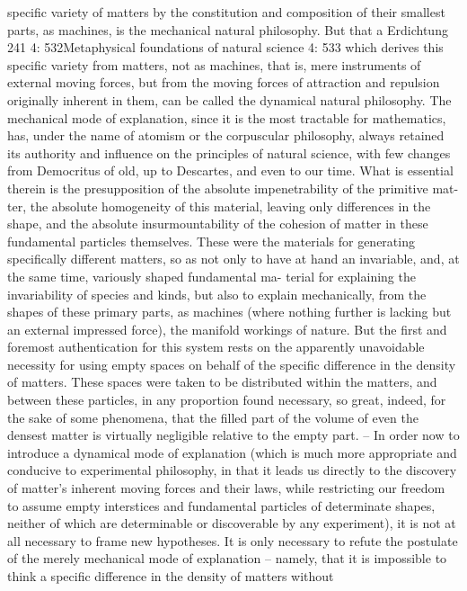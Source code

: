 speciﬁc variety of matters by the constitution and composition of their
smallest parts, as machines, is the mechanical natural philosophy. But that
a
Erdichtung
241
4: 532Metaphysical foundations of natural science
4: 533
which derives this speciﬁc variety from matters, not as machines, that is,
mere instruments of external moving forces, but from the moving forces
of attraction and repulsion originally inherent in them, can be called the
dynamical natural philosophy. The mechanical mode of explanation, since
it is the most tractable for mathematics, has, under the name of atomism
or the corpuscular philosophy, always retained its authority and inﬂuence
on the principles of natural science, with few changes from Democritus
of old, up to Descartes, and even to our time. What is essential therein
is the presupposition of the absolute impenetrability of the primitive mat-
ter, the absolute homogeneity of this material, leaving only differences in
the shape, and the absolute insurmountability of the cohesion of matter
in these fundamental particles themselves. These were the materials for
generating speciﬁcally different matters, so as not only to have at hand
an invariable, and, at the same time, variously shaped fundamental ma-
terial for explaining the invariability of species and kinds, but also to
explain mechanically, from the shapes of these primary parts, as machines
(where nothing further is lacking but an external impressed force), the
manifold workings of nature. But the ﬁrst and foremost authentication
for this system rests on the apparently unavoidable necessity for using
empty spaces on behalf of the speciﬁc difference in the density of matters. These
spaces were taken to be distributed within the matters, and between
these particles, in any proportion found necessary, so great, indeed, for
the sake of some phenomena, that the ﬁlled part of the volume of even
the densest matter is virtually negligible relative to the empty part. –
In order now to introduce a dynamical mode of explanation (which is
much more appropriate and conducive to experimental philosophy, in
that it leads us directly to the discovery of matter’s inherent moving
forces and their laws, while restricting our freedom to assume empty
interstices and fundamental particles of determinate shapes, neither of
which are determinable or discoverable by any experiment), it is not at
all necessary to frame new hypotheses. It is only necessary to refute the
postulate of the merely mechanical mode of explanation – namely, that
it is impossible to think a speciﬁc difference in the density of matters without
